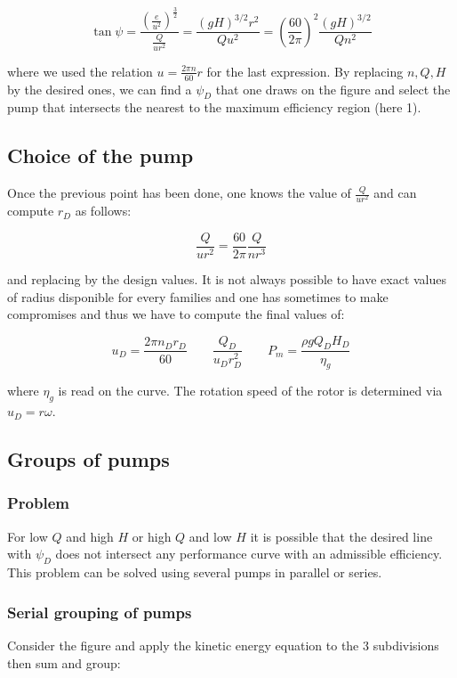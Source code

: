 \begin{equation}
\tan \psi = \frac{\left(\frac{e}{u^2}\right)^{\frac{3}{2}}}{\frac{Q}{ur^2}} = \frac{(gH)^{3/2}r^2}{Qu^2} =\left( \frac{60}{2\pi}\right)^2\frac{(gH)^{3/2}}{Qn^2}
\end{equation}

where we used the relation $u = \frac{2\pi n}{60}r$ for the last expression. By replacing $n,Q,H$ by the desired ones, we can find a $\psi _D$ that one draws on the figure and select the pump that intersects the nearest to the maximum efficiency region (here 1).

\subsection{Choice of the pump}
Once the previous point has been done, one knows the value of $\frac{Q}{ur^2}$ and can compute $r_D$ as follows: 

\begin{equation}
\frac{Q}{ur^2} = \frac{60}{2\pi}\frac{Q}{nr^3}
\end{equation}

and replacing by the design values. It is not always possible to have exact values of radius disponible for every families and one has sometimes to make compromises and thus we have to compute the final values of: 

\begin{equation}
u_D = \frac{2\pi n_D r_D}{60} \qquad \frac{Q_D}{u_D r_D^2}\qquad P_m = \frac{\rho gQ_DH_D}{\eta _g}
\end{equation}

where $\eta _g$ is read on the curve. The rotation speed of the rotor is determined via $u_D = r\omega $.

\subsection{Groups of pumps}
\subsubsection{Problem}
For low $Q$ and high $H$ or high $Q$ and low $H$ it is possible that the desired line with $\psi _D$ does not intersect any performance curve with an admissible efficiency. This problem can be solved using several pumps in parallel or series. 

\subsubsection{Serial grouping of pumps}
Consider the figure and apply the kinetic energy equation to the 3 subdivisions then sum and group: 

